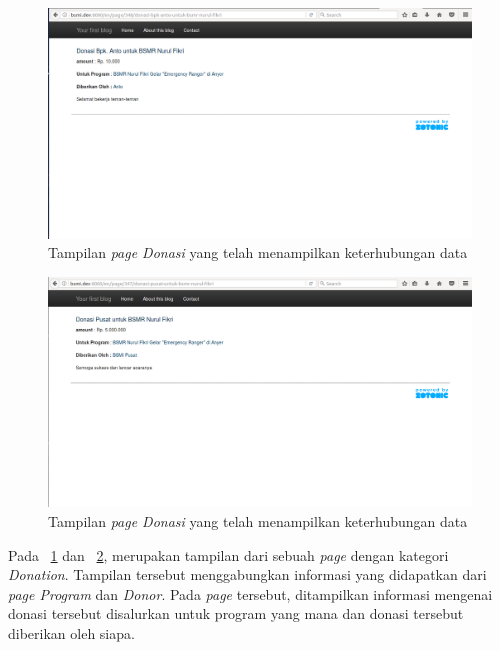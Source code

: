 \begin{figure}
	\centering
	\includegraphics[width=1\textwidth]
	{pics/101-donasi.png}
	\caption{Tampilan \textit{page Donasi} yang telah menampilkan keterhubungan data}
	\label{fig:donationlinked}
\end{figure}
\vspace{-0.3cm}

\begin{figure}
	\centering
	\includegraphics[width=1\textwidth]
	{pics/101-donasi2.png}
	\caption{Tampilan \textit{page Donasi} yang telah menampilkan keterhubungan data}
	\label{fig:donationlinked2}
\end{figure}
\vspace{-0.3cm}

Pada \pic~\ref{fig:donationlinked} dan \pic~\ref{fig:donationlinked2}, merupakan tampilan dari sebuah \textit{page} dengan kategori \textit{Donation}. Tampilan tersebut menggabungkan informasi yang didapatkan dari \textit{page Program} dan \textit{Donor}. Pada \textit{page} tersebut, ditampilkan informasi mengenai donasi tersebut disalurkan untuk program yang mana dan donasi tersebut diberikan oleh siapa.

